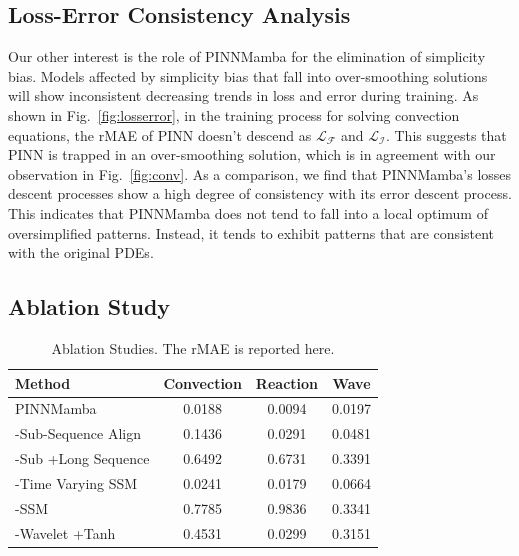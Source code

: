 \documentclass{article}
\theoremstyle{plain}
\theoremstyle{definition}
\theoremstyle{remark}
\begin{document}
\subsection{Loss-Error Consistency Analysis}
\vspace{-1mm}

Our other interest is the role of PINNMamba for the elimination of simplicity bias. Models affected by simplicity bias that fall into over-smoothing solutions will show inconsistent decreasing trends in loss and error during training. 
    As shown in Fig.~\ref{fig:losserror}, in the training process for solving convection equations, the rMAE of PINN doesn't descend as $\mathcal L_\mathcal F$ and $\mathcal L_\mathcal I$. 
        This suggests that PINN is trapped in an over-smoothing solution, which is in agreement with our observation in Fig.~\ref{fig:conv}. 
As a comparison, we find that PINNMamba's losses descent processes show a high degree of consistency with its error descent process. 
    This indicates that PINNMamba does not tend to fall into a local optimum of oversimplified patterns.
        Instead, it tends to exhibit patterns that are consistent with the original PDEs.

\vspace{-2mm}
\subsection{Ablation Study}
\vspace{-1mm}
\begin{table}

  \caption{Ablation Studies. The rMAE is reported here.}
  
  \centering
    \small
  \begin{tabular}{lccc}

    \toprule 
    Method & Convection & Reaction & Wave\\
   \midrule
   PINNMamba & 0.0188 & 0.0094 & 0.0197\\
     -Sub-Sequence Align& 0.1436 & 0.0291& 0.0481\\
    -Sub +Long Sequence &0.6492& 0.6731& 0.3391\\
   -Time Varying SSM& 0.0241& 0.0179 & 0.0664 \\
       -SSM &0.7785& 0.9836& 0.3341\\

   -Wavelet +Tanh & 0.4531 &0.0299& 0.3151\\


   

    \bottomrule
  \end{tabular}
  \normalsize
  \label{tab:ablation}
  \vspace{-3mm}
\end{table}
\end{document}
